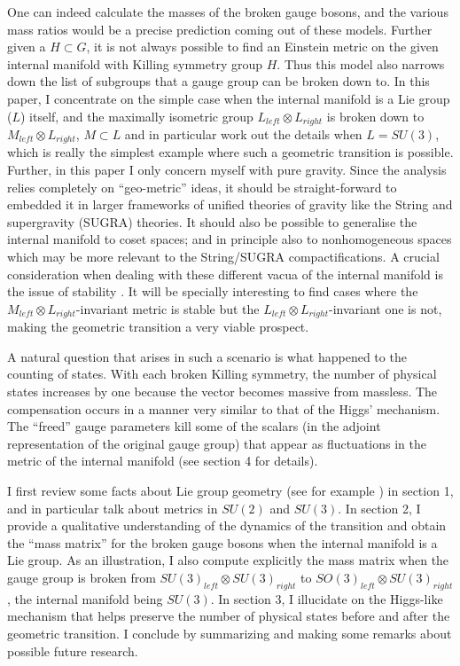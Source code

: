 \documentclass[a4paper,12pt]{article}
\begin{document}
One can indeed calculate the masses of the broken gauge bosons, and the various mass ratios would be a precise prediction coming out of these models. Further given a  $H \subset G$, it is not always possible to find an Einstein metric on the given internal manifold with Killing symmetry group $H$. Thus this model also narrows down the list of subgroups that a gauge group can be broken down to. In this paper, I concentrate on the simple case when the internal manifold is a Lie group ($L$) itself, and the maximally isometric group $L_{left} \otimes L_{right}$ is broken down to $M_{left} \otimes L_{right}$, $M \subset L$ and in particular work out the details when $L=SU(3)$, which is really the simplest example where such a  geometric transition is possible. Further, in this paper I only concern myself with pure gravity. Since the analysis relies completely on ``geo-metric'' ideas, it should be straight-forward to embedded it in larger frameworks of unified  theories of gravity like the String and supergravity (SUGRA) theories. It should also be possible to generalise the internal manifold to coset spaces; and in principle also to nonhomogeneous spaces which may be more relevant to the String/SUGRA compactifications. A crucial consideration when dealing with these different vacua of the  internal manifold is the issue of stability \cite{stability}.  It will be specially interesting to find cases where the $M_{left} \otimes L_{right}$-invariant  metric is stable but the $L_{left} \otimes L_{right}$-invariant  one is not, making the geometric transition a very viable prospect. 

A natural question that arises in such a scenario is what happened to the counting of states. With each broken Killing symmetry, the number of physical states increases by one because the vector becomes massive from massless. The compensation occurs in a manner very similar to that of the Higgs' mechanism. The ``freed'' gauge parameters kill some of the scalars (in the adjoint representation of the original gauge group) that appear as fluctuations in the metric of the internal manifold (see section 4 for details). 

I first review some facts about Lie group geometry (see for example \cite{liegroup}) in section 1, and in particular talk about metrics in $SU(2)$ and $SU(3)$. In section 2, I provide a qualitative understanding of the dynamics of the transition and obtain the ``mass matrix'' for the broken gauge bosons when the internal manifold is a Lie group. As an illustration, I also compute explicitly the mass matrix when the gauge group is broken from $SU(3)_{left}\otimes SU(3)_{right}$ to $SO(3)_{left}\otimes SU(3)_{right}$, the internal manifold being  $SU(3)$. In section 3, I illucidate on the Higgs-like mechanism that helps preserve the number of physical states before and after the geometric transition. I conclude by summarizing and making some remarks about possible future research.
  
\end{document}
